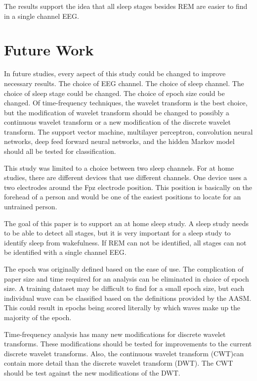 \documentclass[12pt, oneside]{book}
\begin{document}
The results support the idea that all sleep stages besides REM are easier to find in a single channel EEG. 

\section{\textbf{Future Work}}

In future studies, every aspect of this study could be changed to improve necessary results. The choice of EEG channel. The choice of sleep channel. The choice of sleep stage could be changed. The choice of epoch size could be changed. Of time-frequency techniques, the wavelet transform is the best choice, but the modification of wavelet transform should be changed to possibly a continuous wavelet transform or a new modification of the discrete wavelet transform. The support vector machine, multilayer perceptron, convolution neural networks, deep feed forward neural networks, and the hidden Markov model should all be tested for classification. 

This study was limited to a choice between two sleep channels. For at home studies, there are different devices that use different channels. One device uses a two electrodes around the Fpz electrode position. This position is basically on the forehead of a person and would be one of the easiest positions to locate for an untrained person. 

The goal of this paper is to support an at home sleep study. A sleep study needs to be able to detect all stages, but it is very important for a sleep study to identify sleep from wakefulness. If REM can not be identified, all stages can not be identified with a single channel EEG.

The epoch was originally defined based on the ease of use. The complication of paper size and time required for an analysis can be eliminated in choice of epoch size. A training dataset may be difficult to find for a small epoch size, but each individual wave can be classified based on the definitions provided by the AASM. This could result in epochs being scored literally by which waves make up the majority of the epoch.

Time-frequency analysis has many new modifications for discrete wavelet transforms. These modifications should be tested for improvements to the current discrete wavelet transforms. Also, the continuous wavelet transform (CWT)can contain more detail than the discrete wavelet transform (DWT). The CWT should be test against the new modifications of the DWT.

	

\clearpage
\markboth{}{}

\end{document}
